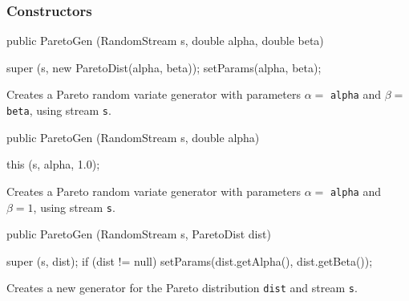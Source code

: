 \subsubsection* {Constructors}
\begin{code}

   public ParetoGen (RandomStream s, double alpha, double beta) \begin{hide} {
      super (s, new ParetoDist(alpha, beta));
      setParams(alpha, beta);
   }\end{hide}
\end{code} 
\begin{tabb} Creates a Pareto random variate generator with parameters $\alpha =$ 
   \texttt{alpha} and $\beta = $ \texttt{beta}, using stream \texttt{s}. 
\end{tabb}
\begin{code}

   public ParetoGen (RandomStream s, double alpha) \begin{hide} {
      this (s, alpha, 1.0);
   }\end{hide}
\end{code} 
\begin{tabb}  Creates a Pareto random variate generator with parameters $\alpha =$ 
   \texttt{alpha} and $\beta = 1$, using stream \texttt{s}. 
\end{tabb}
\begin{code}

   public ParetoGen (RandomStream s, ParetoDist dist) \begin{hide} {
      super (s, dist);
      if (dist != null)
         setParams(dist.getAlpha(), dist.getBeta());
   }\end{hide}
\end{code}
\begin{tabb} Creates a new generator for the Pareto distribution
   \texttt{dist} and stream \texttt{s}.
\end{tabb}

